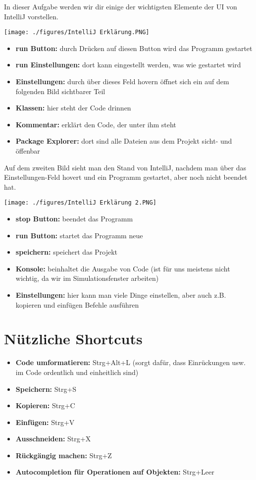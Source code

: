 
\label{ex3}
In dieser Aufgabe werden wir dir einige der wichtigsten Elemente der UI von IntelliJ vorstellen.
\begin{center}
    \texttt{[image: ./figures/IntelliJ Erklärung.PNG]}
\end{center}
\begin{itemize}
    \item \textbf{run Button:} durch Drücken auf diesen Button wird das Programm gestartet
    \item \textbf{run Einstellungen:} dort kann eingestellt werden, was wie gestartet wird
    \item \textbf{Einstellungen:} durch über dieses Feld hovern öffnet sich ein auf dem folgenden Bild sichtbarer Teil
    \item \textbf{Klassen:} hier steht der Code drinnen
    \item \textbf{Kommentar:} erklärt den Code, der unter ihm steht
    \item \textbf{Package Explorer:} dort sind alle Dateien aus dem Projekt sicht- und öffenbar
\end{itemize}
\newpage
Auf dem zweiten Bild sieht man den Stand von IntelliJ, nachdem man über das Einstellungen-Feld hovert und ein Programm gestartet, aber noch nicht beendet hat.
\begin{center}
    \texttt{[image: ./figures/IntelliJ Erklärung 2.PNG]}
\end{center}
\begin{itemize}
    \item \textbf{stop Button:} beendet das Programm
    \item \textbf{run Button:} startet das Programm neue
    \item \textbf{speichern:} speichert das Projekt
    \item \textbf{Konsole:} beinhaltet die Ausgabe von Code (ist für uns meistens nicht wichtig, da wir im Simulationsfenster arbeiten)
    \item \textbf{Einstellungen:} hier kann man viele Dinge einstellen, aber auch z.B. kopieren und einfügen Befehle ausführen
\end{itemize}
\newpage
\section*{Nützliche Shortcuts}
\begin{itemize}
    \item \textbf{Code umformatieren:} Strg+Alt+L (sorgt dafür, dass Einrückungen usw. im Code ordentlich und einheitlich sind)
    \item \textbf{Speichern:} Strg+S
    \item \textbf{Kopieren:} Strg+C 
    \item \textbf{Einfügen:} Strg+V
    \item \textbf{Ausschneiden:} Strg+X
    \item \textbf{Rückgängig machen:} Strg+Z
    \item \textbf{Autocompletion für Operationen auf Objekten:} Strg+Leer
\end{itemize}